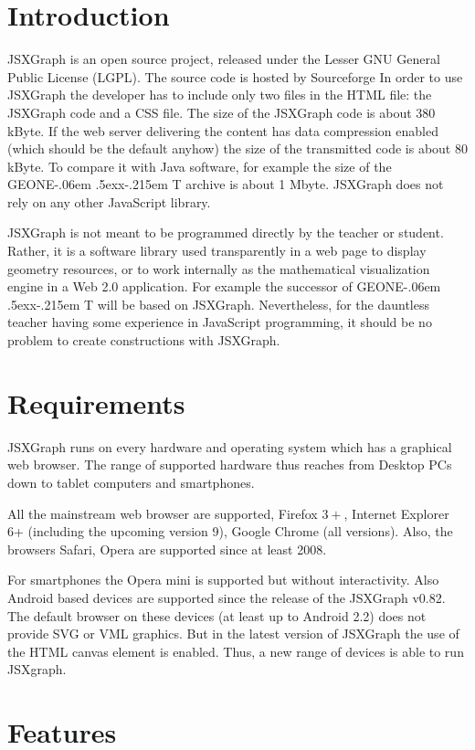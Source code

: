\documentclass[12pt,a4paper]{article}%
\def\GEONExT{GEONE\kern-.06em \lower.5ex\hbox{x}\kern-.215em T}
\begin{document}
\section{Introduction}
JSXGraph is an open source project, released under the Lesser GNU General Public 
License (LGPL). The source code is hosted by Sourceforge
In order to use JSXGraph the developer has to include only two files in the 
HTML file: the JSXGraph code and a CSS file. The  size 
of the JSXGraph code is about 380 kByte. If the web server delivering the 
content has data compression enabled (which should be the default anyhow) the 
size of the transmitted code is about 80 kByte. To compare it with Java software, 
for example the size of the \GEONExT{} archive is about 1 Mbyte. JSXGraph does not 
rely on any other JavaScript library.

JSXGraph is not meant to be programmed directly by the teacher or student. Rather, 
it is a software library used transparently in a web page to display geometry 
resources, or to work internally as the mathematical visualization engine in a 
Web 2.0 application. For example the successor of \GEONExT{} will be based on 
JSXGraph. Nevertheless, for the dauntless teacher having some experience in 
JavaScript programming, it should be no problem to create  constructions with 
JSXGraph.


\section{Requirements}
JSXGraph runs on every hardware and operating system which has a graphical 
web browser. The range of supported hardware thus reaches from Desktop PCs 
down to tablet computers and smartphones.

All the mainstream web browser are supported, Firefox $3+$, Internet Explorer
6+ (including the upcoming version 9), Google Chrome (all versions). 
Also, the browsers Safari, Opera are supported since at least 2008. 

For smartphones the Opera mini is supported but without interactivity.
Also Android based devices are supported since the release of the JSXGraph v0.82.
The default browser on these devices (at least up to Android 2.2) does not provide
SVG or VML graphics. But in the latest version of JSXGraph 
the use of the HTML canvas element is enabled. Thus, a new range of devices is 
able to run JSXgraph.


\section{Features}
\end{document}

